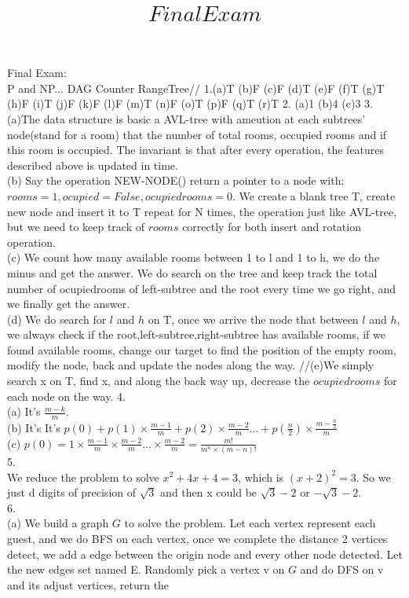 \documentclass[12pt,twoside]{article}
\begin{document}
\title{$Final Exam$}
Final Exam:\\ P and NP... DAG Counter  RangeTree//
1.(a)T (b)F (c)F (d)T (e)F (f)T (g)T (h)F (i)T (j)F (k)F (l)F (m)T (n)F (o)T (p)F (q)T (r)T
2.
(a)1 (b)4 (c)3
3.\\
(a)The data structure is basic a AVL-tree with ameution at each subtrees' node(stand for a room) that the number of total rooms, occupied rooms and if this room is occupied. The invariant is that after every operation, the features described above is updated in time.\\
(b) Say the operation NEW-NODE() return a pointer to a node with:\\
$rooms=1,ocupied=False,ocupiedrooms=0$. We create a blank tree T, create new node and insert it to T repeat for N times, the operation just like AVL-tree, but we need to keep track of $rooms$ correctly for both insert and rotation operation.\\
(c)
We count how many available rooms between 1 to l and 1 to h, we do the minus and get the answer. We do search on the tree and keep track the total number of ocupiedrooms of left-subtree and the root every time we go right, and we finally get the answer.\\
(d)
We do search for $l$ and $h$ on T, once we arrive the node that between $l$ and $h$, we always check if the root,left-subtree,right-subtree has available rooms, if we found available rooms, change our target to find the position of the empty room, modify the node, back and update the nodes along the way.
//(e)We simply search x on T, find x, and along the back way up, decrease the $ocupiedrooms$ for each node on the way.
4.\\
(a) It's $\frac{m-k}{m}$.\\
(b) It's It's $p(0)+p(1)\times \frac{m-1}{m}+p(2)\times \frac{m-2}{m}...+ p(\frac{n}{2})\times \frac{m-\frac{n}{2}}{m}$\\
(c) $p(0)=1\times \frac{m-1}{m}\times\frac{m-2}{m} ... \times \frac{m-2}{m}=\frac{m!}{m^{n}\times (m-n)!}$\\
5.\\
We reduce the problem to solve $x^2+4x+4=3$, which is $(x+2)^2=3$. So we just d digits of precision of $\sqrt{3}$ and then x could be $\sqrt{3}-2$ or $-\sqrt{3}-2$.\\
6.\\
(a) We build a graph $G$ to solve the problem. Let each vertex represent each guest, and we do BFS on each vertex, once we complete the distance 2 vertices detect, we add a edge between the origin node and every other node detected. Let the new edges set named E. Randomly pick a vertex v on $G$ and do DFS on v and its adjust vertices, return the \\
\end{document}
